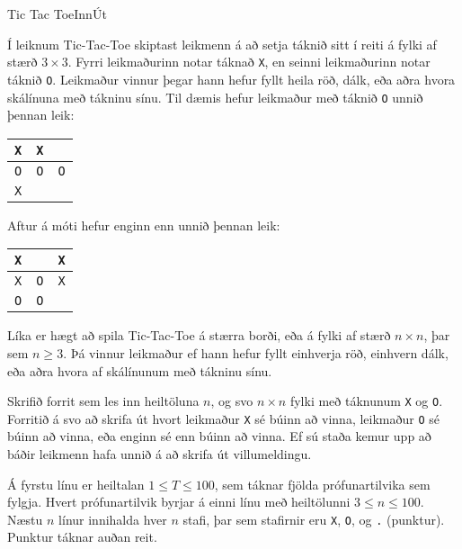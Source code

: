 \begin{problem}{Tic Tac Toe}{Inn}{Út}{~}{~}
	
	Í leiknum Tic-Tac-Toe skiptast leikmenn á að setja táknið sitt í reiti á fylki af stærð $3\times 3$. Fyrri leikmaðurinn notar táknað \texttt{X}, en seinni leikmaðurinn notar táknið \texttt{O}. Leikmaður vinnur þegar hann hefur fyllt heila röð, dálk, eða aðra hvora skálínuna með tákninu sínu. Til dæmis hefur leikmaður með táknið \texttt{O} unnið þennan leik:

	\begin{center}
		\begin{tabular}{c|c|c}
			\texttt{X} & \texttt{X} & \\
			\hline
			\texttt{O} & \texttt{O} & \texttt{O} \\
			\hline
			\texttt{X} & & \\
		\end{tabular}
	\end{center}

	Aftur á móti hefur enginn enn unnið þennan leik:

	\begin{center}
		\begin{tabular}{c|c|c}
			\texttt{X} & & \texttt{X} \\
			\hline
			\texttt{X} & \texttt{O} & \texttt{X} \\
			\hline
			\texttt{O} & \texttt{O} & \\
		\end{tabular}
	\end{center}

	Líka er hægt að spila Tic-Tac-Toe á stærra borði, eða á fylki af stærð $n\times n$, þar sem $n \geq 3$. Þá vinnur leikmaður ef hann hefur fyllt einhverja röð, einhvern dálk, eða aðra hvora af skálínunum með tákninu sínu.

	Skrifið forrit sem les inn heiltöluna $n$, og svo $n\times n$ fylki með táknunum \texttt{X} og \texttt{O}. Forritið á svo að skrifa út hvort leikmaður \texttt{X} sé búinn að vinna, leikmaður \texttt{O} sé búinn að vinna, eða enginn sé enn búinn að vinna. Ef sú staða kemur upp að báðir leikmenn hafa unnið á að skrifa út villumeldingu.

	\Input

		Á fyrstu línu er heiltalan $1 \leq T \leq 100$, sem táknar fjölda prófunartilvika sem fylgja. Hvert prófunartilvik byrjar á einni línu með heiltölunni $3 \leq n \leq 100$. Næstu $n$ línur innihalda hver $n$ stafi, þar sem stafirnir eru \texttt{X}, \texttt{O}, og \texttt{.} (punktur). Punktur táknar auðan reit.


\end{problem}
